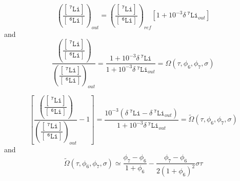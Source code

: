 \documentclass[aps,onecolumn,11pt]{revtex4}
\newcommand{\mychem}[1]{\mathtt{#1}}
\newcommand{\myconc}[1]{\left\lbrack{#1}\right\rbrack}
\newcommand{\spLi}[1]{{~^{\mychem{#1}}\mychem{Li}}}
\newcommand{\Li}[1]{\myconc{\spLi{#1}}}
\newcommand{\ratioLi}{ {\left(\dfrac{\Li{7}}{\Li{6}}\right)} }
\newcommand{\deltaLi}{ {\delta\!\!\spLi{7}} }
\begin{document}
\begin{equation}
	\ratioLi_{out} = \ratioLi_{ref} \left[ 1 + 10^{-3}  \deltaLi_{out} \right]
\end{equation}
and
\begin{equation}
\boxed{
	\dfrac{\ratioLi}{\ratioLi_{out}} = \dfrac{1+10^{-3}\deltaLi}{1+10^{-3}\deltaLi_{out}} = \Omega\left(\tau,\phi_6,\phi_7,\sigma\right)
	}
\end{equation}

\begin{equation}
{
	\left\lbrack\dfrac{\ratioLi}{\ratioLi_{out}} - 1 \right\rbrack =
	 \dfrac{10^{-3}\left(\deltaLi-\deltaLi_{out}\right)}{1+10^{-3}\deltaLi_{out}} = \tilde\Omega\left(\tau,\phi_6,\phi_7,\sigma\right)
}
\end{equation}
and
\begin{equation}
	\tilde\Omega\left(\tau,\phi_6,\phi_7,\sigma\right) \simeq \dfrac{\phi_7-\phi_6}{1+\phi_6} - \dfrac{\phi_7-\phi_6}{2\left(1+\phi_6\right)^2} \sigma \tau
\end{equation}
\end{document}
